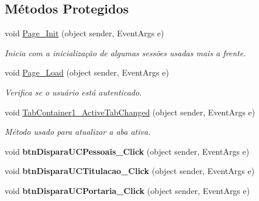 \subsection*{Métodos Protegidos}
\begin{DoxyCompactItemize}
\item 
void \hyperlink{class_sistema_r_h_1_1_cadastro_docs_a05c607a06287f55c9dff094b5622cb22}{Page\_\-Init} (object sender, EventArgs e)
\begin{DoxyCompactList}\small\item\em Inicia com a inicialização de algumas sessões usadas mais a frente. \item\end{DoxyCompactList}\item 
void \hyperlink{class_sistema_r_h_1_1_cadastro_docs_ac6987d83c4f8a879cc9b05d436546d1a}{Page\_\-Load} (object sender, EventArgs e)
\begin{DoxyCompactList}\small\item\em Verifica se o usuário está autenticado. \item\end{DoxyCompactList}\item 
void \hyperlink{class_sistema_r_h_1_1_cadastro_docs_a78da227c95d9bf41349b941b9705172f}{TabContainer1\_\-ActiveTabChanged} (object sender, EventArgs e)
\begin{DoxyCompactList}\small\item\em Método usado para atualizar a aba ativa. \item\end{DoxyCompactList}\item 
\hypertarget{class_sistema_r_h_1_1_cadastro_docs_a051e23a2b7bc363727d17812a33c5622}{
void {\bfseries btnDisparaUCPessoais\_\-Click} (object sender, EventArgs e)}
\label{class_sistema_r_h_1_1_cadastro_docs_a051e23a2b7bc363727d17812a33c5622}

\item 
\hypertarget{class_sistema_r_h_1_1_cadastro_docs_a5d9b077aa7378b05becd561dad1cbe77}{
void {\bfseries btnDisparaUCTitulacao\_\-Click} (object sender, EventArgs e)}
\label{class_sistema_r_h_1_1_cadastro_docs_a5d9b077aa7378b05becd561dad1cbe77}

\item 
\hypertarget{class_sistema_r_h_1_1_cadastro_docs_a1b524d2744f6541a9f4ab00be2f6db12}{
void {\bfseries btnDisparaUCPortaria\_\-Click} (object sender, EventArgs e)}
\label{class_sistema_r_h_1_1_cadastro_docs_a1b524d2744f6541a9f4ab00be2f6db12}


\end{DoxyCompactItemize}
